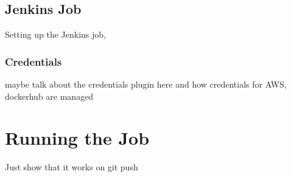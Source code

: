 	\subsection{Jenkins Job}
	Setting up the Jenkins job,
	\subsubsection{Credentials}
	maybe talk about the credentials plugin here and how credentials for AWS, dockerhub are managed
	\section{Running the Job}
	Just show that it works on git push